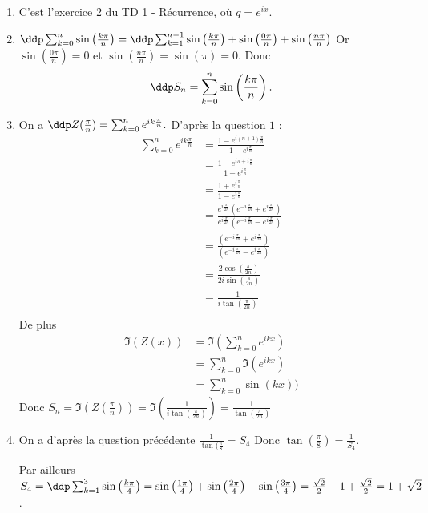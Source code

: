 \begin{correction}
\begin{enumerate}
\item C'est l'exercice 2 du TD 1 - Récurrence, où $q=e^{ix}$. 
\item $\ddp \sum_{k=0}^{n} \sin \left( \frac{k\pi}{n}\right) =  \ddp \sum_{k=1}^{n-1} \sin \left( \frac{k\pi}{n}\right)  + \sin\left( \frac{0\pi}{n}\right) + \sin\left( \frac{n\pi}{n}\right) $
Or $ \sin\left( \frac{0\pi}{n}\right)=0$ et $ \sin\left( \frac{n\pi}{n}\right)=\sin(\pi)=0 $. Donc 
$$\ddp S_n = \sum_{k=0}^{n} \sin \left( \frac{k\pi}{n}\right).$$
\item  On a $\ddp Z(\frac{\pi}{n})= \sum_{k=0}^n e^{ik\frac{\pi}{n}}.$ D'après la question $1$ : 
\begin{align*}
\sum_{k=0}^n e^{ik\frac{\pi}{n}}&= \frac{1-e^{i(n+1)\frac{\pi}{n}}}{1-e^{i\frac{\pi}{n}}}\\
												&=\frac{1-e^{i\pi +i\frac{\pi}{n}}}{1-e^{i\frac{\pi}{n}}}\\
												&=\frac{1+e^{i\frac{\pi}{n}}}{1-e^{i\frac{\pi}{n}}}\\
												&=\frac{e^{i\frac{\pi}{2n}}  \left(e^{-i\frac{\pi}{2n}}+e^{i\frac{\pi}{2n}}\right)  }{   e^{i\frac{\pi}{2n}}  \left(e^{-i\frac{\pi}{2n}}-e^{i\frac{\pi}{2n}}\right)  }\\
											&=\frac{  \left(e^{-i\frac{\pi}{2n}}+e^{i\frac{\pi}{2n}}\right)  }{     \left(e^{-i\frac{\pi}{2n}}-e^{i\frac{\pi}{2n}}\right)  }\\
										&=\frac{ 2\cos(\frac{\pi}{2n} ) }{  2i \sin(\frac{\pi}{2n})} \\
										&=\frac{ 1  }{  i \tan(\frac{\pi}{2n})} \\										
\end{align*}
De plus 
\begin{align*}
\Im(Z(x))&= \Im\left(\sum_{k=0}^n e^{ikx}\right)\\
							&=\sum_{k=0}^n \Im(e^{ikx})\\
							&=\sum_{k=0}^n \sin(kx))
\end{align*}
Donc $S_n= \Im( Z(\frac{\pi}{n})) = \Im(\frac{ 1  }{  i \tan(\frac{\pi}{2n})}) =\frac{ 1  }{  \tan(\frac{\pi}{2n})}$

\item On a d'après la question précédente $\frac{1}{\tan(\frac{\pi}{8}}= S_4$
Donc $\tan(\frac{\pi}{8})= \frac{1}{S_4}$.

Par ailleurs $S_4=\ddp \sum_{k=1}^{3} \sin \left( \frac{k\pi}{4}\right) =  \sin \left( \frac{1\pi}{4}\right)+ \sin \left( \frac{2\pi}{4}\right)+ \sin \left( \frac{3\pi}{4}\right) = \frac{\sqrt{2}}{2}+1+\frac{\sqrt{2}}{2}=1+\sqrt{2}$.


\end{enumerate}
\end{correction}
